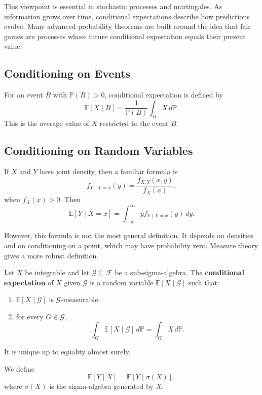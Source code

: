 This viewpoint is essential in stochastic processes and martingales. As information grows over time, conditional expectations describe how predictions evolve. Many advanced probability theorems are built around the idea that fair games are processes whose future conditional expectation equals their present value.

\subsection{Conditioning on Events}

For an event $B$ with $\mathbb{P}(B)>0$, conditional expectation is defined by
\[
    \mathbb{E}[X\mid B]=\frac{1}{\mathbb{P}(B)}\int_B X\,d\mathbb{P}.
\]
This is the average value of $X$ restricted to the event $B$.

\subsection{Conditioning on Random Variables}

If $X$ and $Y$ have joint density, then a familiar formula is
\[
    f_{Y\mid X=x}(y)=\frac{f_{X,Y}(x,y)}{f_X(x)},
\]
when $f_X(x)>0$. Then
\[
    \mathbb{E}[Y\mid X=x]=\int_{-\infty}^{\infty}y f_{Y\mid X=x}(y)\,dy.
\]

However, this formula is not the most general definition. It depends on densities and on conditioning on a point, which may have probability zero. Measure theory gives a more robust definition.

\begin{definition}
Let $X$ be integrable and let $\mathcal{G}\subseteq\mathcal{F}$ be a sub-sigma-algebra. The \textbf{conditional expectation} of $X$ given $\mathcal{G}$ is a random variable $\mathbb{E}[X\mid\mathcal{G}]$ such that:
\begin{enumerate}
    \item $\mathbb{E}[X\mid\mathcal{G}]$ is $\mathcal{G}$-measurable;
    \item for every $G\in\mathcal{G}$,
    \[
        \int_G \mathbb{E}[X\mid\mathcal{G}]\,d\mathbb{P}=\int_G X\,d\mathbb{P}.
    \]
\end{enumerate}
It is unique up to equality almost surely.
\end{definition}

\begin{definition}
We define
\[
    \mathbb{E}[Y\mid X]=\mathbb{E}[Y\mid\sigma(X)],
\]
where $\sigma(X)$ is the sigma-algebra generated by $X$.
\end{definition}

